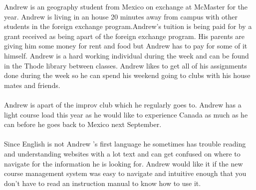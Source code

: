 \documentclass[10pt]{article}
\begin{document}
Andrew is an geography student from Mexico on exchange at McMaster for the year. Andrew is living in an house 20 minutes away from campus with other students in the foreign exchange program.Andrew's tuition is being paid for by a grant received as being apart of the foreign exchange program. His parents are giving him some money for rent and food but Andrew has to pay for some of it himself. Andrew is a hard working individual during the week and can be found in the Thode library between classes. Andrew likes to get all of his assignments done during the week so he can spend his weekend going to clubs with his house mates and friends.\\ \\
Andrew is apart of the improv club which he regularly goes to. Andrew has a light course load this year as he would like to experience Canada as much as he can before he goes back to Mexico next September.\\ \\
Since English is not Andrew 's first language he sometimes has trouble reading and understanding websites with a lot text and can get confused on where to navigate for the information he is looking for. Andrew would like it if the new course management system was easy to navigate and intuitive enough that you don't have to read an instruction manual to know how to use it.

\newpage


\end{document}
